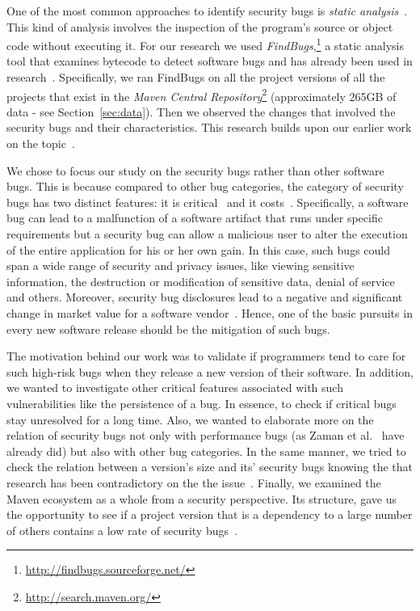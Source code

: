 \documentclass[conference]{llncs}
\begin{document}
One of the most common approaches to identify security bugs is
{\it static analysis}~\cite{CW07}. This kind of analysis involves the
inspection of the program's source or object code without executing
it. For our research we used {\it FindBugs},\footnote{\url{http://findbugs.sourceforge.net/}}
a static analysis tool that examines bytecode to detect software bugs and has already been used in
research~\cite{AP10}\cite{HP07}\cite{HP04}\cite{HW08}\cite{SHP06}.
Specifically, we ran FindBugs on all the project
versions of all the projects that exist in the
{\it Maven Central Repository}\footnote{\url{http://search.maven.org/}}
(approximately 265GB of data - see Section~\ref{sec:data}).
Then we observed the changes that involved the security bugs and their characteristics.
This research builds upon our earlier work on the topic~\cite{MGS12}.

We chose to focus our study on the security bugs rather than other
software bugs. This is because compared to other bug categories,
the category of security bugs has two distinct features: it is critical~\cite{SZ12}
and it costs~\cite{BCL08}\cite{R06}. Specifically, a software bug can
lead to a malfunction of a software artifact that runs under specific
requirements but a security bug can allow a malicious user to alter the execution
of the entire application for his or her own gain. In this case, such bugs could span a wide
range of security and privacy issues, like viewing sensitive information, the destruction or
modification of sensitive data, denial of service and others.
Moreover, security bug disclosures lead to a negative and significant change
in market value for a software vendor~\cite{TW07}.
Hence, one of the basic pursuits in every new software release should
be the mitigation of such bugs.

The motivation behind our work was to validate if programmers tend to care for
such high-risk bugs when they release a new version of their software. In
addition, we wanted to investigate other critical features associated with such
vulnerabilities like the persistence of a bug. In essence, to check if critical bugs stay
unresolved for a long time. Also, we wanted to elaborate more on the relation of security
bugs not only with performance bugs (as Zaman et al.~\cite{ZAH11} have already
did) but also with other bug categories. In the same manner, we tried to check
the relation between a version's size and its' security bugs knowing the
that research has been contradictory on the the
issue~\cite{BP84}\cite{SYTP85}\cite{NBZ06}\cite{GKMS00}.
Finally, we examined the Maven ecosystem as a whole from a security
perspective. Its structure, gave us the opportunity to see if a project version that is a dependency to
a large number of others contains a low rate of security bugs~\cite{MW10}.
\end{document}
